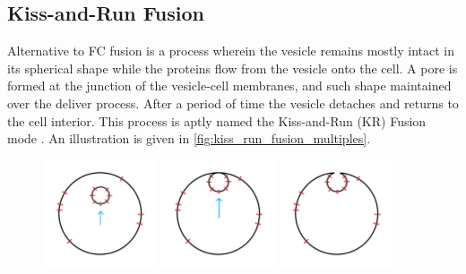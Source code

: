 \documentclass{report}
\begin{document}
\subsection{Kiss-and-Run Fusion}
Alternative to FC fusion is a process wherein the vesicle remains mostly intact in its spherical shape while the proteins flow from the vesicle onto the cell. A pore is formed at the junction of the vesicle-cell membranes, and such shape maintained over the deliver process. After a period of time the vesicle detaches and returns to the cell interior. This process is aptly named the Kiss-and-Run (KR) Fusion mode \cite{alabi2013perspectives}. An illustration is given in \autoref{fig:kiss_run_fusion_multiples}.

\begin{figure}
	\centering

	\includegraphics[width = 0.3\textwidth]{kr_fusion/3transport.png}
	\includegraphics[width = 0.3\textwidth]{kr_fusion/4dock.png}
	\includegraphics[width = 0.3\textwidth]{kr_fusion/5pore.png}


\end{figure}
\end{document}
